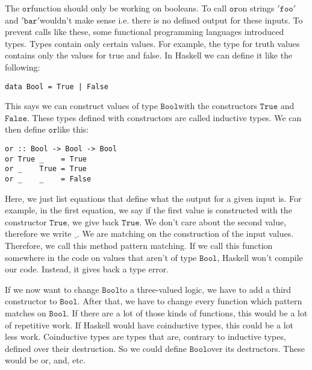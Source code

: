 \documentclass[a4paper,cleardoubleempty,BCOR1cm]{scrbook}
\begin{document}
The $\mathtt{or}$\;function should only be working on booleans. To call $\mathtt{or}$\;on strings
$\mathtt{'foo'}$\;and $\mathtt{'bar'}$\;wouldn't make sense i.e. there is no defined output for
these inputs. To prevent calls like these, some functional programming
languages introduced types. Types contain only certain values. For example, the
type for truth values contains only the values for true and false. In Haskell
we can define it like the following:
\begin{verbatim}
data Bool = True | False
\end{verbatim}
This says we can construct values of type $\mathtt{Bool}$\;with the constructors $\mathtt{True}$
and $\mathtt{False}$. These types defined with constructors are called inductive types. We can
then define $\mathtt{or}$\;like this:
\begin{verbatim}
or :: Bool -> Bool -> Bool
or True _    = True
or _    True = True
or _    _    = False
\end{verbatim}
Here, we just list equations that define what the output for a given input is.
For example, in the first equation, we say if the first value is constructed
with the constructor $\mathtt{True}$, we give back $\mathtt{True}$.  We don't care about the
second value, therefore we write $\mathtt{\_}$.  We are matching on the construction of
the input values.  Therefore, we call this method pattern matching.
If we call this function somewhere in the code on values that aren't of type
$\mathtt{Bool}$,  Haskell won't compile our code.  Instead, it gives back a type error.

If we now want to change $\mathtt{Bool}$\;to a three-valued logic, we have to add a
third constructor to $\mathtt{Bool}$. After that, we have to change every function which
pattern matches on $\mathtt{Bool}$. If there are a lot of those kinds of functions,
this would be a lot of repetitive work. If Haskell would have coinductive types,
this could be a lot less work. Coinductive types are types that are,
contrary to inductive types, defined over their destruction. So we could define
$\mathtt{Bool}$\;over its destructors. These would be or, and, etc.
\end{document}
